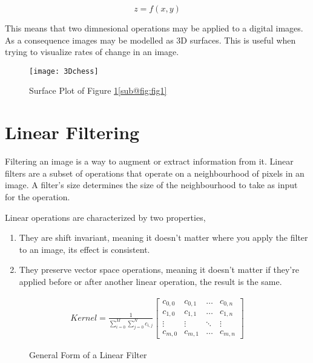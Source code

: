 \begin{equation}
    z = f(x,y)
    \label{eq:2Dfunc}
\end{equation}

This means that two dimnesional operations may be applied to a digital images. As a consequence images may be modelled as 3D surfaces. This is useful when trying to visualize rates of change in an image.

\begin{figure}[ht!]
  \centering
  \centering\texttt{[image: 3Dchess]}
  \caption{\label{fig:fig1} Surface Plot of Figure \ref{fig:fig1}\ref{sub@fig:fig1}}
\end{figure}




\section{Linear Filtering}

Filtering an image is a way to augment or extract information from it. Linear filters are a subset of operations that operate on a neighbourhood of pixels in an image. A filter's size determines the size of the neighbourhood to take as input for the operation.

Linear operations are characterized by two properties,

\begin{enumerate}
  \item They are shift invariant, meaning it doesn't matter where you apply the filter to an image, its effect is consistent.
  \item They preserve vector space operations, meaning it doesn't matter if they're applied before or after another linear operation, the result is the same.
\end{enumerate}

\begin{figure}[H]
  \begin{gather}
    Kernel  = \frac{1}{\sum\limits_{i=0}^{M}\sum\limits_{j=0}^{N}c_{i,j}}
    \begin{bmatrix}
      c_{0,0} & c_{0,1} & \dots & c_{0,n} \\
      c_{1,0} & c_{1,1} & \dots & c_{1,n} \\
      \vdots & \vdots & \ddots & \vdots \\
      c_{m,0} & c_{m,1} & \dots & c_{m,n}
    \end{bmatrix}
  \end{gather}
  \caption{General Form of a Linear Filter}
  \label{fig:generalForm}
\end{figure}


